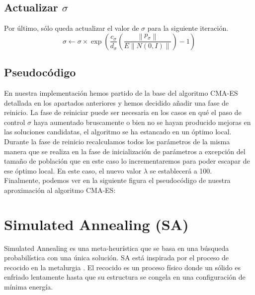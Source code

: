 \subsection{Actualizar $ \sigma $}
Por último, sólo queda actualizar el valor de $\sigma$ para la siguiente iteración. 
\begin{equation} \label{eq:6}
     \sigma\leftarrow\sigma \times \exp(\frac{c_{\sigma}}{d_{\sigma}} (\frac{\left \| p_{\sigma}\right\|}{E \left \|N(0, I)\right \|}) - 1)
\end{equation}

\subsection{Pseudocódigo}

En nuestra implementación hemos partido de la base del algoritmo CMA-ES detallada en los apartados anteriores y hemos decidido añadir una fase de reinicio. La fase de reiniciar puede ser necesaria en los casos en qué el paso de control $\sigma$ haya aumentado bruscamente o bien no se hayan producido mejoras en las soluciones candidatas, el algoritmo se ha estancado en un óptimo local. \\

Durante la fase de reinicio recalculamos todos los parámetros de la misma manera que se realiza en la fase de inicialización de parámetros a excepción del tamaño de población que en este caso lo incrementaremos para poder escapar de ese óptimo local. En este caso, el nuevo valor $\lambda$ se establecerá a 100. \\

Finalmente, podemos ver en la siguiente figura el pseudocódigo de nuestra aproximación al algoritmo CMA-ES:


\section{Simulated Annealing (SA)}
\label{sec:SA}

Simulated Annealing es una meta-heurística que se basa en una búsqueda probabilística con una única solución. SA está inspirada por el proceso de recocido en la metalurgia \cite{metabook}. El recocido es un proceso físico donde un sólido es enfriado lentamente hasta que su estructura se congela en una configuración de mínima energía. \cite{metabook}




